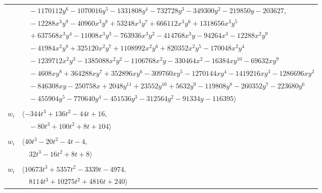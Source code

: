 \documentclass[11pt]{article}
\begin{document}
\begin{longtable}{@{}ll@{}}
 & $\quad -1170112y^{6}-1070016y^{5}-1331808y^{4}-732728y^{3}-349300y^{2}-219850y-203627,$\\
 & $\quad -12288x^{3}y^{9}-40960x^{3}y^{8}+53248x^{3}y^{7}+666112x^{3}y^{6}+1318656x^{3}y^{5}$\\
 & $\quad +637568x^{3}y^{4}-11008x^{3}y^{3}-763936x^{3}y^{2}-414768x^{3}y-94264x^{3}-12288x^{2}y^{9}$\\
 & $\quad -41984x^{2}y^{8}+325120x^{2}y^{7}+1108992x^{2}y^{6}+820352x^{2}y^{5}-170048x^{2}y^{4}$\\
 & $\quad -1239712x^{2}y^{3}-1385088x^{2}y^{2}-1106768x^{2}y-330464x^{2}-16384xy^{10}-69632xy^{9}$\\
 & $\quad -4608xy^{8}+364288xy^{7}+352896xy^{6}-309760xy^{5}-1270144xy^{4}-1419216xy^{3}-1286696xy^{2}$\\
 & $\quad -846308xy-250758x+2048y^{11}+23552y^{10}+5632y^{9}-119808y^{8}-260352y^{7}-223680y^{6}$\\
 & $\quad -455904y^{5}-770640y^{4}-451536y^{3}-312564y^{2}-91334y-116395\rangle$\\
\addlinespace[2pt]
\multicolumn{2}{@{}p{0.97\textwidth}@{}}{$i=16$, $D_i=2$, $\rho_{ij}$: $2{:}1, \allowbreak 13{:}2, \allowbreak 14{:}1, \allowbreak 19{:}2, \allowbreak 20{:}2, \allowbreak 27{:}2, \allowbreak 30{:}1, \allowbreak 34{:}1, \allowbreak 54{:}1$}\\
$w_i$ & $\langle -344t^{3}+136t^{2}-44t+16,$\\
 & $\quad -80t^{3}+100t^{2}+8t+104\rangle$\\
\addlinespace[2pt]
\multicolumn{2}{@{}p{0.97\textwidth}@{}}{$i=17$, $D_i=2$, $\rho_{ij}$: $2{:}1, \allowbreak 18{:}1, \allowbreak 26{:}2, \allowbreak 30{:}2, \allowbreak 33{:}2, \allowbreak 38{:}2, \allowbreak 57{:}1$}\\
$w_i$ & $\langle 40t^{3}-20t^{2}-4t-4,$\\
 & $\quad 32t^{3}-16t^{2}+8t+8\rangle$\\
\addlinespace[2pt]
\multicolumn{2}{@{}p{0.97\textwidth}@{}}{$i=18$, $D_i=64$, $\rho_{ij}$: $5{:}1, \allowbreak 14{:}2, \allowbreak 17{:}2, \allowbreak 30{:}1, \allowbreak 36{:}1, \allowbreak 37{:}2, \allowbreak 39{:}2, \allowbreak 40{:}2, \allowbreak 46{:}2, \allowbreak 48{:}2, \allowbreak 50{:}2, \allowbreak 55{:}1, \allowbreak 56{:}2, \allowbreak 58{:}1, \allowbreak 60{:}1, \allowbreak 63{:}2$}\\
$w_i$ & $\langle 10673t^{3}+5357t^{2}-3339t-4974,$\\
 & $\quad 8114t^{3}+10275t^{2}+4816t+240\rangle$\\

\end{longtable}
\end{document}
